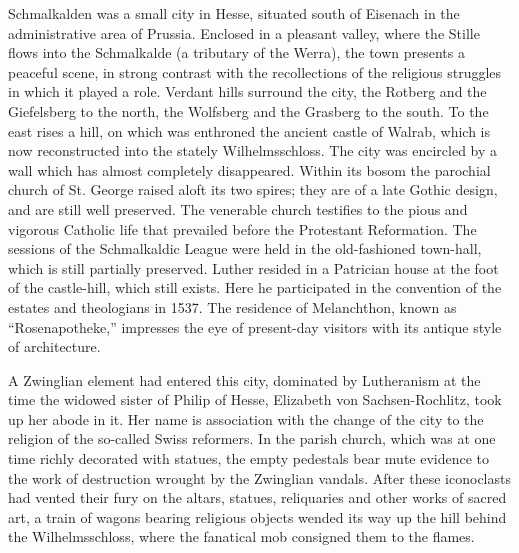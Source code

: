 Schmalkalden was a small city in Hesse, situated south of Eisenach
in the administrative area of Prussia. Enclosed in a pleasant valley,
where the Stille flows into the Schmalkalde (a tributary of the
Werra), the town presents a peaceful scene, in strong contrast with
the recollections of the religious struggles in which it played a role.
Verdant hills surround the city, the Rotberg and the Giefelsberg to
the north, the Wolfsberg and the Grasberg to the south. To the east
rises a hill, on which was enthroned the ancient castle of Walrab,
which is now reconstructed into the stately Wilhelmsschloss. The city
was encircled by a wall which has almost completely disappeared.
Within its bosom the parochial church of St. George raised aloft its
two spires; they are of a late Gothic design, and are still well preserved.
The venerable church testifies to the pious and vigorous
Catholic life that prevailed before the Protestant Reformation. The
sessions of the Schmalkaldic League were held in the old-fashioned
town-hall, which is still partially preserved. Luther resided in a Patrician
house at the foot of the castle-hill, which still exists. Here he
participated in the convention of the estates and theologians in 1537.
The residence of Melanchthon, known as “Rosenapotheke,” impresses
the eye of present-day visitors with its antique style of architecture.

A Zwinglian element had entered this city, dominated by Lutheranism at
the time the widowed sister of Philip of Hesse, Elizabeth von
Sachsen-Rochlitz, took up her abode in it. Her name is association
with the change of the city to the religion of the so-called Swiss
reformers. In the parish church, which was at one time richly decorated
with statues, the empty pedestals bear mute evidence to the work of
destruction wrought by the Zwinglian vandals. After these iconoclasts
had vented their fury on the altars, statues, reliquaries and
other works of sacred art, a train of wagons bearing religious objects
wended its way up the hill behind the Wilhelmsschloss, where
the fanatical mob consigned them to the flames.
